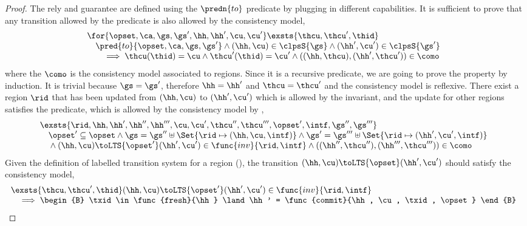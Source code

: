 \begin{proof}
The rely and guarantee are defined using the \( \predn{to}\) predicate by plugging in different capabilities.
It is sufficient to prove that any transition allowed by the  predicate is also allowed by the consistency model,
\[
\begin{array}{@{}l}
    \for{\opset, \ca, \gs, \gs', \hh, \hh', \cu, \cu'}
    \exsts{\thcu, \thcu', \thid} \\
    \quad \pred{to}{\opset, \ca, \gs, \gs'} 
    \land (\hh, \cu) \in \clpsS{\gs}
    \land (\hh', \cu') \in \clpsS{\gs'} \\
    \qquad \implies 
    \thcu(\thid) = \cu
    \land \thcu'(\thid) = \cu'
    \land ((\hh, \thcu),(\hh', \thcu')) \in \como
\end{array}
\]
where the \( \como \) is the consistency model associated to regions.
Since it is a recursive predicate, we are going to prove the property by induction.
\caseB{\(\opset = \unitO\)}
It is trivial because \(\gs = \gs'\), therefore \( \hh = \hh' \) and \( \thcu = \thcu' \) and the consistency model is reflexive.
\caseI{\(\opset \neq \unitO\)}
There exist a region \( \rid \) that has been updated from \( (\hh, \cu) \) to \( (\hh', \cu') \) which is allowed by the invariant, and the update for other regions satisfies the  predicate, which is allowed by the consistency model by \ih,
\[
    \begin{array}[t]{@{}l}
    \exsts{\rid, \hh, \hh', \hh'', \hh''', \cu, \cu', \thcu'', \thcu''', \opset', \intf, \gs'',\gs''' }  \\
    \quad \opset' \subseteq \opset
    \land \gs = \gs'' \uplus \Set{\rid \mapsto (\hh, \cu, \intf)} 
    \land \gs' = \gs''' \uplus \Set{\rid \mapsto (\hh', \cu', \intf)}  \\
    \quad {} \land (\hh,\cu) \toLTS{\opset'} (\hh',\cu') \in \func{inv}{\rid, \intf }
    \land ((\hh'', \thcu''),(\hh''',\thcu''')) \in \como
    \end{array}
\]
Given the definition of labelled transition system for a region (), the transition \( (\hh, \cu) \toLTS{\opset} (\hh', \cu') \) should satisfy the consistency model,
\[
\begin{array}{@{}l}
    \exsts{ \thcu, \thcu', \thid } 
    (\hh, \cu) \toLTS{\opset'} (\hh', \cu') \in \func{inv}{\rid, \intf} \\
    \quad \implies
    \begin{B}
    \txid \in \func{fresh}{\hh} 
    \land \hh' = \func{commit}{\hh, \cu, \txid, \opset} 

\end{B}
\end{array}\]
\end{proof}

